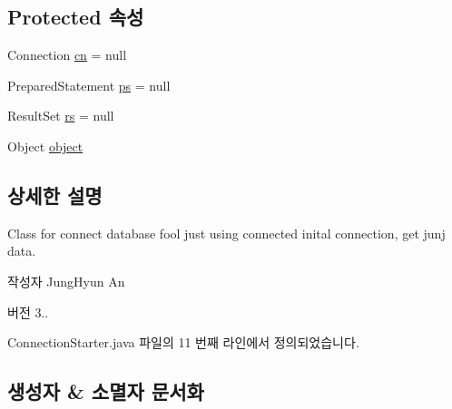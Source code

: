 \subsection*{Protected 속성}
\begin{DoxyCompactItemize}
\item 
Connection \mbox{\hyperlink{classcom_1_1github_1_1aites_1_1framework_1_1globalknowledge_1_1_d_b_connector_af00c95ca08c2b39cb47ee4286e9f2469}{cn}} = null
\item 
Prepared\+Statement \mbox{\hyperlink{classcom_1_1github_1_1aites_1_1framework_1_1globalknowledge_1_1_d_b_connector_a2a6dbc151015e5fe147a4d155ae7a145}{ps}} = null
\item 
Result\+Set \mbox{\hyperlink{classcom_1_1github_1_1aites_1_1framework_1_1globalknowledge_1_1_d_b_connector_a36c87b41d86e8382bea688b2ca209764}{rs}} = null
\item 
Object \mbox{\hyperlink{classcom_1_1github_1_1aites_1_1framework_1_1globalknowledge_1_1_d_b_connector_ab6f6f9f00c22d311dca48a3a424fd6a3}{object}}
\end{DoxyCompactItemize}


\subsection{상세한 설명}
Class for connect database fool just using connected inital connection, get junj data. 

\begin{DoxyAuthor}{작성자}
Jung\+Hyun An 
\end{DoxyAuthor}
\begin{DoxyVersion}{버전}
3.. 
\end{DoxyVersion}


Connection\+Starter.\+java 파일의 11 번째 라인에서 정의되었습니다.



\subsection{생성자 \& 소멸자 문서화}
\mbox{\label{classcom_1_1github_1_1aites_1_1framework_1_1globalknowledge_1_1_connection_starter_a1079547a70ed3aa50a2b092de2d3fa47}} 
